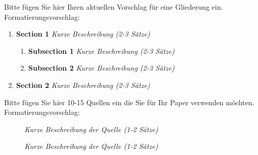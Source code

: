 \documentclass[
    ngerman,american
    ]{scrartcl}
\newcommand{\lang}{en}
\begin{document}
        \sectionInitialTOC{\lang}
        Bitte fügen Sie hier Ihren aktuellen Vorschlag für eine Gliederung ein. 
        Formatierungsvorschlag:
        
        
        \begin{enumerate}
            \item \textbf{Section 1} \textit{Kurze Beschreibung (2-3 Sätze)}
                    \begin{enumerate}
                        \item \textbf{Subsection 1} \textit{Kurze Beschreibung (2-3 Sätze)}
                        \item \textbf{Subsection 2} \textit{Kurze Beschreibung (2-3 Sätze)}
                    \end{enumerate}
            \item \textbf{Section 2} \textit{Kurze Beschreibung (2-3 Sätze)}
        \end{enumerate}
    
      
        \sectionSource{\lang}
        Bitte fügen Sie hier 10-15 Quellen ein die Sie für Ihr Paper verwenden möchten.
        Formatierungsvorschlag:
        
        \begin{description}
        \item[\cite{gruba_how_2017}] \textit{Kurze Beschreibung der Quelle (1-2 Sätze)}
        \item[\cite{zobel_writing_2015}] \textit{Kurze Beschreibung der Quelle (1-2 Sätze)}
        \end{description}
        
        
      \printbibliography
    
\end{document}

